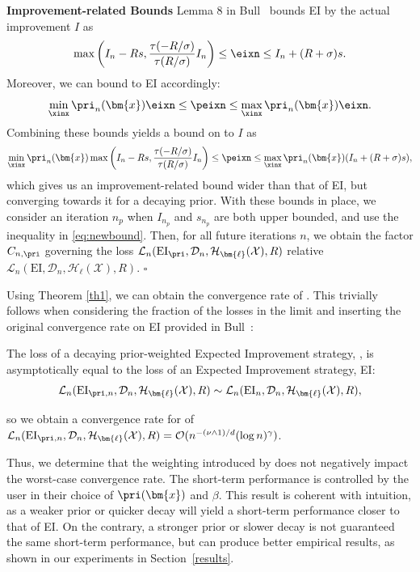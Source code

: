 \textbf{Improvement-related Bounds}\quad
Lemma 8 in Bull~\citep{JMLR:v12:bull11a} bounds EI by the actual improvement $I$ as
\begin{equation}
    \max\left(I_n-Rs, \frac{\tau(-R/\sigma)}{\tau(R/\sigma)}I_n   \right) \leq \eixn \leq I_n + (R + \sigma)s.
\end{equation}
Moreover, we can bound \pei{} to EI accordingly:
\begin{equation}
    {\min_{\xinx}\pri_n(\bm{x})}\eixn \leq \peixn \leq {\max_{\xinx}\pri_n(\bm{x})}\eixn.
\end{equation}
Combining these bounds yields a bound on \pei{} to $I$ as
\begin{equation} \label{eq:newbound}
    {\min_{\xinx}\pri_n(\bm{x})}\max\left(I_n-Rs, \frac{\tau(-R/\sigma)}{\tau(R/\sigma)}I_n\right) \leq \peixn \leq {\max_{\xinx}\pri_n(\bm{x})} (I_n + (R + \sigma)s), 
\end{equation}
which gives us an improvement-related bound wider than that of EI, but converging towards it for a decaying prior. With these bounds in place, we consider an iteration $n_p$ when $I_{n_p}$ and $s_{n_p}$ are both upper bounded, and use the inequality in \eqref{eq:newbound}. Then, for all future iterations $n$, we obtain the factor $C_{n, \pri}$ governing the loss $\mathcal{L}_{n}(\text{EI}_\pri, \mathcal{D}_n, \mathcal{H}_{\bm{\ell}}(\mathcal{X}), R)$ relative $\mathcal{L}_{n}(\text{EI}, \mathcal{D}_n, \mathcal{H}_{\bm{\ell}}(\mathcal{X}), R)$. \hfill$\square$ 

Using Theorem \ref{th1}, we can obtain the convergence rate of \pei{}. This trivially follows 
when considering the fraction of the losses in the limit and inserting the original convergence rate on EI provided in Bull~\citep{JMLR:v12:bull11a}:

\begin{corollary} The loss of a decaying prior-weighted Expected Improvement strategy, \pei{}, is asymptotically equal to the loss of an Expected Improvement strategy, EI:
\begin{equation}
    \mathcal{L}_{n}(\text{EI}_{\pri, n}, \mathcal{D}_n, \mathcal{H}_{\bm{\ell}}(\mathcal{X}), R) \sim  \mathcal{L}_{n}(\text{EI}_n, \mathcal{D}_n, \mathcal{H}_{\bm{\ell}}(\mathcal{X}), R),
\end{equation}

so we obtain a convergence rate for \pei{} of $\mathcal{L}_{n}(\text{EI}_{\pri, n}, \mathcal{D}_n, \mathcal{H}_{\bm{\ell}}(\mathcal{X}), R) = \mathcal{O}(n^{-(\nu \land 1)/d}(\log n)^\gamma)$.
\end{corollary}

Thus, we determine that the weighting introduced by \pei{} does not negatively impact the worst-case convergence rate. The short-term performance is controlled by the user in their choice of $\pri(\bm{x})$ and $\beta$. This result is coherent with intuition, as a weaker prior or quicker decay will yield a short-term performance closer to that of EI. On the contrary, a stronger prior or slower decay is not guaranteed the same short-term performance, but can produce better empirical results, as shown in our experiments in Section~\ref{results}.